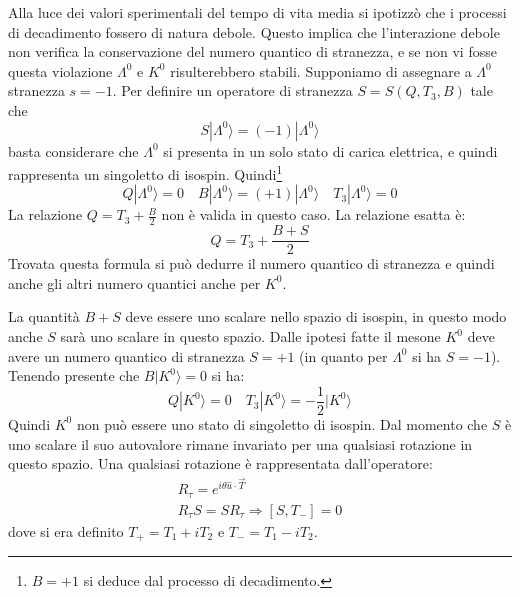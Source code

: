 Alla luce dei valori sperimentali del tempo di vita media si ipotizzò che i
processi di decadimento fossero di natura debole.
Questo implica che l'interazione debole non verifica la conservazione del numero
quantico di stranezza, e se non vi fosse questa violazione $\Lambda^0$ e $K^0$
risulterebbero stabili.
Supponiamo di assegnare a $\Lambda^0$ stranezza $s=-1$.
Per definire un operatore di stranezza $S=S(Q,T_3,B)$ tale che
\[
S|\Lambda^0\rangle =(-1)|\Lambda^0\rangle
\]
basta considerare che $\Lambda^0$ si presenta in un solo stato di carica
elettrica, e quindi rappresenta un singoletto di isospin. Quindi\footnote{$B=+1$
si deduce dal processo di decadimento.}
\[
Q|\Lambda^0\rangle =0 \quad B|\Lambda^0\rangle =(+1)|\Lambda^0\rangle \quad T_3|\Lambda^0\rangle =0
\]
La relazione $Q=T_3+\frac{B}{2}$ non è valida in questo caso. La relazione esatta è:
\[
Q=T_3+\frac{B+S}{2}
\]
Trovata questa formula si può dedurre il numero quantico di stranezza e quindi anche gli altri numero quantici anche per $K^0$.

 La quantità $B+S$ deve essere uno scalare nello spazio di isospin, in questo modo anche
$S$ sarà uno scalare in questo spazio.
Dalle ipotesi fatte il mesone $K^0$ deve avere un numero quantico di stranezza $S=+1$ (in quanto per $\Lambda^0$ si ha $S=-1$).
Tenendo presente che $B|K^0\rangle =0$ si ha:
\begin{equation}
Q|K^0\rangle =0\quad T_3|K^0\rangle =-\frac{1}{2}|K^0\rangle
\end{equation}
Quindi $K^0$ non può essere uno stato di singoletto di isospin.
Dal momento che $S$ è uno scalare il suo autovalore rimane invariato per una qualsiasi rotazione in questo spazio.
Una qualsiasi rotazione è rappresentata dall'operatore:
\begin{gather}
R_{\tau}=e^{i\theta \hat{u}\cdot\vec{T}}\\
R_{\tau}S=SR_{\tau}\Rightarrow [S,T_-]=0
\end{gather}
dove si era definito $T_+=T_1+iT_2$ e $T_-=T_1-iT_2$.

